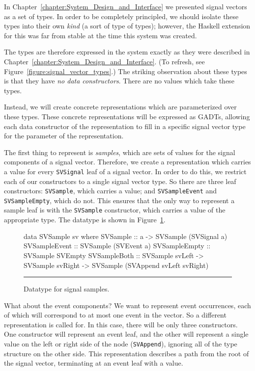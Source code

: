 In Chapter~\ref{chapter:System_Design_and_Interface} we presented signal vectors
as a set of types. In order to be completely principled, we should isolate these
types into their own {\em kind} (a sort of type of types); however, the Haskell
extension for this was far from stable at the time this system was created.

The types are therefore expressed in the system exactly as they were described
in Chapter~\ref{chapter:System_Design_and_Interface}. (To refresh, see
Figure~\ref{figure:signal_vector_types}.) The striking observation about these
types is that they have {\em no data constructors}. There are no values which
take these types.

Instead, we will create concrete representations which are parameterized over
these types. These concrete representations will be expressed as GADTs, allowing
each data constructor of the representation to fill in a specific signal vector
type for the parameter of the representation.

The first thing to represent is {\em samples}, which are sets of values for
the signal components of a signal vector. Therefore, we create a representation
which carries a value for every {\tt SVSignal} leaf of a signal vector. In order
to do this, we restrict each of our constructors to a single signal vector type.
So there are three leaf constructors: {\tt SVSample}, which carries a value; and
{\tt SVSampleEvent} and {\tt SVSampleEmpty}, which do not. This ensures that the
only way to represent a sample leaf is with the {\tt SVSample} constructor,
which carries a value of the appropriate type. The datatype is shown in
Figure~\ref{figure:signal_sample_datatype}.

\begin{figure}
\begin{code}
data SVSample sv where
  SVSample      ::    a
                   -> SVSample (SVSignal a)
  SVSampleEvent ::    SVSample (SVEvent a)
  SVSampleEmpty ::    SVSample SVEmpty
  SVSampleBoth  ::    SVSample svLeft
                   -> SVSample svRight
                   -> SVSample (SVAppend svLeft svRight)
\end{code}
\hrule
\caption{Datatype for signal samples.}
\label{figure:signal_sample_datatype}
\end{figure}

What about the event components? We want to represent event occurrences,
each of which will correspond to at most one event in the vector. So a different
representation is called for. In this case, there will be only three
constructors. One constructor will represent an event leaf, and the other will
represent a single value on the left or right side of the node ({\tt SVAppend}),
ignoring all of the type structure on the other side. This representation
describes a path from the root of the signal vector, terminating at an event
leaf with a value.

